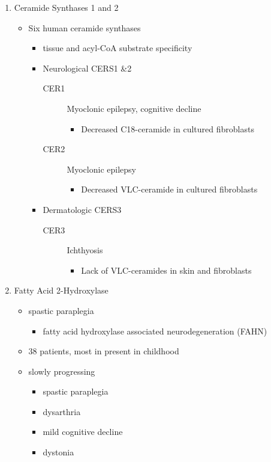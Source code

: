 \documentclass{scrartcl}
\begin{document}
\begin{enumerate}
\item Ceramide Synthases 1 and 2
\label{sec:orgce5d069}

\begin{itemize}
\item Six human ceramide synthases
\begin{itemize}
\item tissue and acyl-CoA substrate specificity
\item Neurological CERS1 \&2
\begin{description}
\item[{CER1}] Myoclonic epilepsy, cognitive decline
\begin{itemize}
\item Decreased C18-ceramide in cultured fibroblasts
\end{itemize}
\item[{CER2}] Myoclonic epilepsy
\begin{itemize}
\item Decreased VLC-ceramide in cultured fibroblasts
\end{itemize}
\end{description}
\item Dermatologic CERS3
\begin{description}
\item[{CER3}] Ichthyosis
\begin{itemize}
\item Lack of VLC-ceramides in skin and fibroblasts
\end{itemize}
\end{description}
\end{itemize}
\end{itemize}

\item Fatty Acid 2-Hydroxylase
\label{sec:org04eb507}

\begin{itemize}
\item spastic paraplegia
\begin{itemize}
\item fatty acid hydroxylase associated neurodegeneration (FAHN)
\end{itemize}
\item 38 patients, most in present in childhood
\item slowly progressing
\begin{itemize}
\item spastic paraplegia
\item dysarthria
\item mild cognitive decline
\item dystonia
\end{itemize}


\end{itemize}
\end{enumerate}
\end{document}
